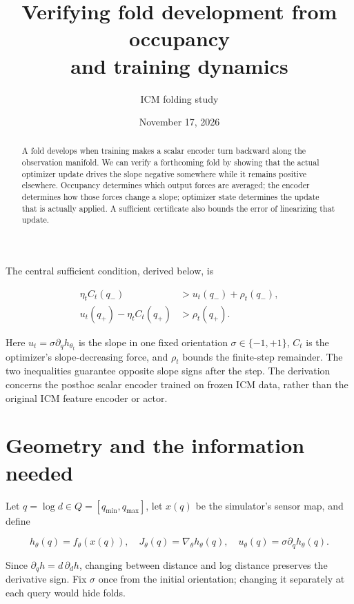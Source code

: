 \documentclass[11pt]{article}
\title{Verifying fold development from occupancy\\and training dynamics}
\author{ICM folding study}
\date{November 17, 2026}
\begin{document}
\maketitle
\begin{abstract}
A fold develops when training makes a scalar encoder turn backward along
the observation manifold. We can verify a forthcoming fold by showing
that the actual optimizer update drives the slope negative somewhere
while it remains positive elsewhere. Occupancy determines which output
forces are averaged; the encoder determines how those forces change a
slope; optimizer state determines the update that is actually applied. A
sufficient certificate also bounds the error of linearizing that update.
\end{abstract}


The central sufficient condition, derived below, is

\begin{equation}\label{eq:criterion}
\boxed{\begin{aligned}
\eta_t C_t(q_-) &> u_t(q_-)+\rho_t(q_-),\\
u_t(q_+)-\eta_t C_t(q_+) &>\rho_t(q_+).\end{aligned}}
\end{equation}

Here \(u_t=\sigma\partial_q h_{\theta_t}\) is the slope in one fixed
orientation \(\sigma\in\{-1,+1\}\), \(C_t\) is the optimizer's
slope-decreasing force, and \(\rho_t\) bounds the finite-step remainder.
The two inequalities guarantee opposite slope signs after the step. The
derivation concerns the posthoc scalar encoder trained on frozen ICM
data, rather than the original ICM feature encoder or actor.

\section{Geometry and the information
needed}\label{geometry-and-the-information-needed}

Let \(q=\log d\in Q=[q_{\min},q_{\max}]\), let \(x(q)\) be the
simulator's sensor map, and define

\[
h_\theta(q)=f_\theta(x(q)),\quad
J_\theta(q)=\nabla_\theta h_\theta(q),\quad
u_\theta(q)=\sigma\partial_qh_\theta(q).
\]

Since \(\partial_qh=d\,\partial_dh\), changing between distance and log
distance preserves the derivative sign. Fix \(\sigma\) once from the
initial orientation; changing it separately at each query would hide
folds.
\end{document}
